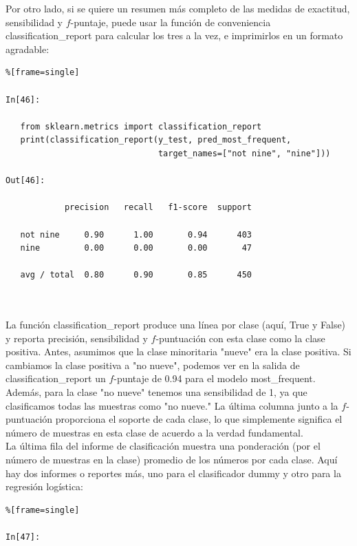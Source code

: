 { 
Por otro lado, si se quiere un resumen más completo de las medidas de exactitud, sensibilidad y  $f$-puntaje,   puede usar la función de conveniencia {\ttfamily classification\_report}  para calcular los tres a la vez, e imprimirlos en un formato agradable:

\begin{lstlisting}%[frame=single]

In[46]:

   from sklearn.metrics import classification_report
   print(classification_report(y_test, pred_most_frequent,
                               target_names=["not nine", "nine"]))

Out[46]:

            precision   recall   f1-score  support
             
   not nine     0.90      1.00       0.94      403
   nine         0.00      0.00       0.00       47
   
   avg / total  0.80      0.90       0.85      450



\end{lstlisting}



La función {\ttfamily classification\_report} produce una línea por clase (aquí, True y False) y reporta precisión, sensibilidad y $f$-puntuación con esta clase como la clase positiva. Antes, asumimos que la clase  minoritaria "{}nueve"{}  era la clase positiva.  Si cambiamos la clase positiva a "{}no nueve"{},  podemos ver en la salida de {\ttfamily  classification\_report}  un $f$-puntaje de 0.94 para el modelo {\ttfamily most\_frequent}.  Además, para la clase "{}no nueve"{} \: tenemos una sensibilidad de 1, ya que clasificamos todas las muestras como  "{}no nueve."{}    La última columna junto a la $f$-puntuación proporciona el soporte de cada clase, lo que simplemente significa el número de muestras en esta clase de acuerdo a la verdad fundamental.\\


 
La última fila del informe de clasificación muestra una ponderación (por el número de muestras
en la clase) promedio de los números por cada clase.  Aquí hay dos informes o reportes más, uno para
el clasificador dummy y otro para la regresión logística:


\begin{lstlisting}%[frame=single]

In[47]:


\end{lstlisting}}
